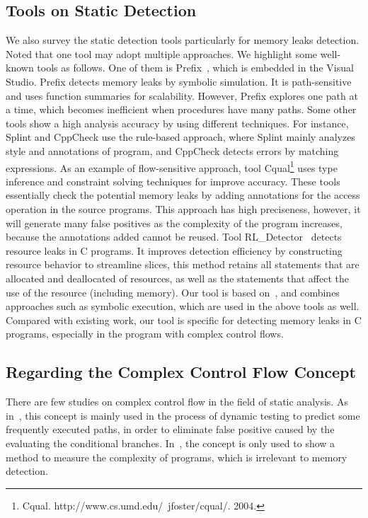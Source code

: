 \subsection{Tools on Static Detection}
We also survey the static detection tools particularly for memory leaks detection. Noted that one tool may adopt multiple approaches. We highlight some well-known tools as follows. One of them is Prefix~\cite{BPS00}, which is embedded in the Visual Studio. Prefix detects memory leaks by symbolic simulation. It is path-sensitive and uses function summaries for scalability. However, Prefix explores one path at a time, which becomes inefficient when procedures have many paths. %
Some other tools show a high analysis accuracy by using different techniques. For instance, Splint and CppCheck use the rule-based approach, where Splint mainly analyzes style and annotations of program, and CppCheck detects errors by matching expressions. As an example of flow-sensitive approach, tool Cqual\footnote{Cqual. http://www.cs.umd.edu/~jfoster/cqual/. 2004.} uses type inference and constraint solving techniques for improve accuracy. These tools essentially check the potential memory leaks by adding annotations for the access operation in the source programs. This approach has high preciseness, however, it will generate many false positives as the complexity of the program increases, because the annotations added cannot be reused. Tool RL\_Detector~\cite{J14} detects resource leaks in C programs. It improves detection efficiency by constructing resource behavior to streamline slices, this method retains all statements that are allocated and deallocated of resources, as well as the statements that affect the use of the resource (including memory). Our tool is based on~\cite{XA05,YZ04}, and combines approaches such as symbolic execution, which are used in the above tools as well. Compared with existing work, our tool is specific for detecting memory leaks in C programs, especially in the program with complex control flows. 

\subsection{Regarding the Complex Control Flow Concept}
There are few studies on complex control flow in the field of static analysis. As in~\cite{KJMP06}, this concept is mainly used in the process of dynamic testing to predict some frequently executed paths, in order to eliminate false positive caused by the evaluating the conditional branches. In~\cite{KK12}, the concept is only used to show a method to measure the complexity of programs, which is irrelevant to memory detection. %

